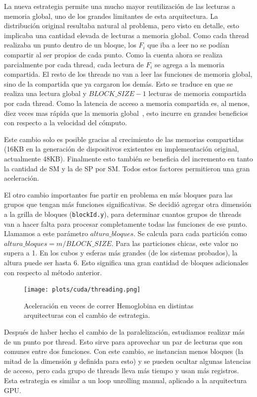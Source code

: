 La nueva estrategia permite una mucho mayor reutilizaci\'on de las lecturas a memoria
global, uno de los grandes limitantes de esta arquitectura.
La distribuci\'on original resultaba natural al problema, pero visto en detalle, esto
implicaba una cantidad elevada de lecturas a memoria global. Como cada thread realizaba un
punto dentro de un bloque, los $F_i$ que iba a leer no se pod\'ian compartir al ser
propios de cada punto. Como la cuenta ahora se realiza parcialmente por cada thread,
cada lectura de $F_i$ se agrega a la memoria compartida. El resto de los threads no van
a leer las funciones  de memoria global, sino de la compartida que ya cargaron los dem\'as. Esto
se traduce en que se realiza una lectura global y $BLOCK\_SIZE-1$ lecturas
de memoria compartida por cada thread. Como la latencia de acceso a memoria compartida
es, al menos, diez veces mas r\'apida que la memoria global~\cite{Demystifying}, esto incurre en grandes
beneficios con respecto a la velocidad del c\'omputo.

Este cambio solo es posible gracias al crecimiento de las memorias compartidas (16KB en la generaci\'on de
dispositivos existentes en implementaci\'on original, actualmente 48KB). Finalmente
esto tambi\'en se beneficia del incremento en tanto la cantidad de SM y la de SP por
SM. Todos estos factores permitieron una gran aceleraci\'on.

El otro cambio importantes fue partir en problema en m\'as bloques para las grupos que tengan
m\'as funciones significativas. Se decidi\'o agregar otra dimensi\'on a la grilla de bloques (\texttt{blockId.y}),
para determinar cuantos grupos de threads van a hacer falta para procesar completamente
todas las funciones de ese punto. Llamamos a este par\'ametro $altura\_bloques$. Se
calcula para cada partici\'on como $altura\_bloques = {m}/{BLOCK\_SIZE}$.
Para las particiones chicas, este valor no supera a 1. En los cubos y esferas m\'as
grandes (de los sistemas probados), la altura puede ser hasta 6. Esto significa una gran
cantidad de bloques adicionales con respecto al m\'etodo anterior.

\begin{figure}[htbp]
   \centering
   \texttt{[image: plots/cuda/threading.png]}
   \caption{Aceleraci\'on en veces de correr Hemoglobina en distintas arquitecturas con el cambio de estrategia.}
   \label{fig:threading}
\end{figure}


Despu\'es de haber hecho el cambio de la paralelizaci\'on, estudiamos realizar
m\'as de un punto por thread. Esto sirve para aprovechar un par de lecturas que son comunes
entre dos funciones. Con este cambio, se instancian menos bloques (la mitad de la dimensi\'on $y$
definida para esto) y se pueden ocultar algunas latencias de acceso, pero
cada grupo de threads lleva m\'as tiempo y usan m\'as registros. Esta estrategia es similar
a un loop unrolling manual, aplicado a la arquitectura GPU.

